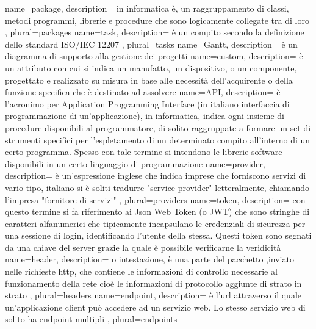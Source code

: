 \makeglossary
 {
	name=package,
	description={ in informatica è, un raggruppamento di classi, metodi programmi, librerie e procedure che sono logicamente collegate tra di loro
	},
	plural=packages
}
 {
	name=task,
	description={ è un compito secondo la definizione dello standard ISO/IEC 12207
	},
	plural=tasks
}
 {
	name=Gantt,
	description={  è un diagramma di supporto alla gestione dei progetti
	}
}
 {
	name=custom,
	description={ è un attributo con cui si indica un manufatto, un dispositivo, o un componente, progettato e realizzato su misura in base alle necessità dell'acquirente o della funzione specifica che è destinato ad assolvere
	}
}
 {
	name=API,
	description={ è l'acronimo per Application Programming Interface (in italiano interfaccia di programmazione di un'applicazione), in informatica, indica ogni insieme di procedure disponibili al programmatore, di solito raggruppate a formare un set di strumenti specifici per l'espletamento di un determinato compito all'interno di un certo programma. Spesso con tale termine si intendono le librerie software disponibili in un certo linguaggio di programmazione
	}
}
 {
	name=provider,
	description={ è un'espressione inglese che indica imprese che forniscono servizi di vario tipo,  italiano si è soliti tradurre "service provider" letteralmente, chiamando l'impresa "fornitore di servizi"
	},
	plural=providers
}
 {
	name=token,
	description={ con questo termine si fa riferimento ai Json Web Token (o JWT) che sono stringhe di caratteri alfanumerici che tipicamente incapsulano le credenziali di sicurezza per una sessione di login, identificando l'utente della stessa. Questi token sono segnati da una chiave del server grazie la quale è possibile verificarne la veridicità
	}
}
 {
	name=header,
	description={ o intestazione, è una parte del pacchetto ,inviato nelle richieste http, che contiene le informazioni di controllo necessarie al funzionamento della rete cioè le informazioni di protocollo aggiunte di strato in strato
	},
	plural=headers
}
 {
	name=endpoint,
	description={ è l'url attraverso il quale un'applicazione client può accedere ad un servizio web. Lo stesso servizio web di solito ha endpoint multipli
	},
	plural=endpoints
}
